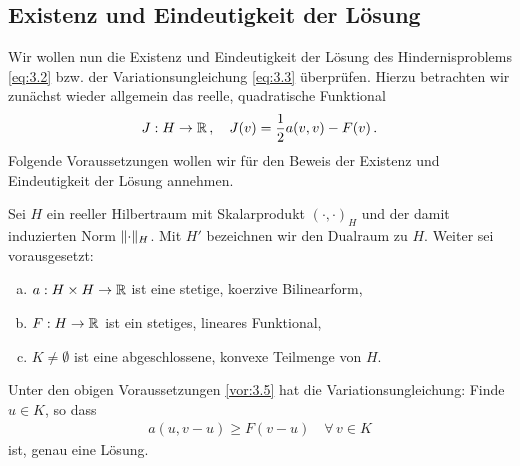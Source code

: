 



\subsection{Existenz und Eindeutigkeit der Lösung}
\label{kap:3.1.2}


Wir wollen nun die Existenz und Eindeutigkeit der Lösung des Hindernisproblems \eqref{eq:3.2} bzw. der Variationsungleichung \eqref{eq:3.3} überprüfen. Hierzu betrachten wir zunächst wieder allgemein das  reelle, quadratische Funktional
\[
	J: H \rightarrow \mathbb{R} \, ,\quad J(v) = \frac 1 2 a(v,v) - F(v) \, .
\]
Folgende Voraussetzungen wollen wir für den Beweis der Existenz und Eindeutigkeit der Lösung annehmen.

\begin{vor}\label{vor:3.5}
Sei $H$ ein reeller Hilbertraum mit Skalarprodukt $(\cdot,\cdot)_H$ und der damit induzierten Norm $\lVert \cdot\rVert_H$. Mit $H'$ bezeichnen wir den Dualraum zu $H$. Weiter sei vorausgesetzt:
\begin{enumerate}[(a)]
\item $a: H\times H \rightarrow \mathbb{R}$ ist eine stetige, koerzive Bilinearform,
\item $F:H\rightarrow\mathbb{R}$ ist ein stetiges, lineares Funktional,
\item $K\not = \emptyset$ ist eine abgeschlossene, konvexe Teilmenge von $H$.
\end{enumerate}
\end{vor}


\begin{theorem}\label{theorem:3.6}
Unter den obigen Voraussetzungen \ref{vor:3.5} hat die Variationsungleichung: Finde $u\in K$, so dass
\begin{align}\label{eq:3.7}
	a(u,v-u) \ge F(v-u) \quad \forall \, v \in K
\end{align}
ist, genau eine Lösung.
\end{theorem}

